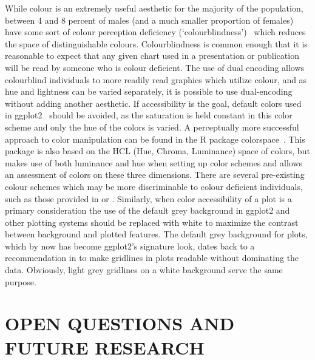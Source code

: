 \documentclass[letterpaper]{ar-1col}\usepackage[]{graphicx}\usepackage[]{color}
\newcommand{\todo}[1]{\textcolor{pink}{#1}}
\begin{document}
While colour is an extremely useful aesthetic for the majority of the population, between 4 and 8 percent of males (and a much smaller proportion of females) have some sort of colour perception deficiency (`colourblindness')~\citep{wakitaSmartColorDisambiguationFramework2005} which reduces the space of distinguishable colours. Colourblindness is common enough that it is reasonable to expect that any given chart used in a presentation or publication will be read by someone who is colour deficient. The use of dual encoding allows colourblind individuals to more readily read graphics which utilize colour, and as hue and lightness can be varied separately, it is possible to use dual-encoding without adding another aesthetic. If accessibility is the goal,
default colors used in ggplot2~\citep{ggplot2} should be avoided, as the saturation is held constant in this color scheme and only the hue of the colors is varied. A perceptually more successful approach to color manipulation can be found in the R package colorspace~\citep{zeileis}. This package is also based on the HCL (Hue, Chroma, Luminance) space of colors, but makes use of both luminance and hue when setting up color schemes and allows an assessment of colors on these three dimensions.
 There are several pre-existing colour schemes which may be more discriminable to colour deficient individuals, such as those provided in \citet{dichromatpackage} or \citet{colorbrewer}. Similarly, when color accessibility of a plot is a primary consideration the use of the default grey background in ggplot2 and other plotting systems should be replaced with white to maximize the contrast between background and plotted features. The default grey background for plots, which by now has become ggplot2's signature look, dates back to a recommendation in \citet{dancarr.grey} to make gridlines in plots readable without dominating the data. Obviously, light grey gridlines on a white background serve the same purpose.



\section{OPEN QUESTIONS AND FUTURE RESEARCH} %
\end{document}
